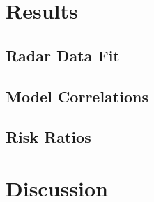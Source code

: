 \documentclass[12pt,a4paper]{report}
\begin{document}
\section{Results}\label{sec:results}

\subsection{Radar Data Fit}\label{subsec:radardatafit}


\subsection{Model Correlations}\label{subsec:modelcorr}


\subsection{Risk Ratios}\label{subsec:riskratio}



\section{Discussion}\label{sec:discussion}

\end{document}
